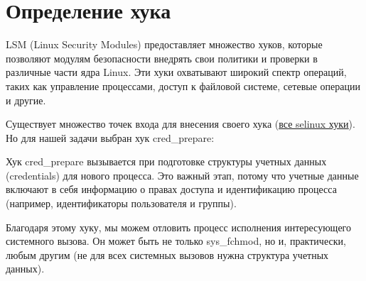 \chapter{Определение хука}
\label{hook-0}

\begin{flushleft}
LSM (Linux Security Modules) предоставляет множество хуков, которые позволяют модулям безопасности внедрять свои политики и проверки в различные части ядра Linux. Эти хуки охватывают широкий спектр операций, таких как управление процессами, доступ к файловой системе, сетевые операции и другие.
	
Существует множество точек входа для внесения своего хука (\href{https://elixir.bootlin.com/linux/v6.1/source/security/selinux/hooks.c#L7116}{\underline{все selinux хуки}}). Но для нашей задачи выбран хук cred\_prepare:

Хук cred\_prepare вызывается при подготовке структуры учетных данных (credentials) для нового процесса. Это важный этап, потому что учетные данные включают в себя информацию о правах доступа и идентификацию процесса (например, идентификаторы пользователя и группы).

Благодаря этому хуку, мы можем отловить процесс исполнения интересующего системного вызова. Он может быть не только sys\_fchmod, но и, практически, любым другим (не для всех системных вызовов нужна структура учетных данных).
\end{flushleft}
